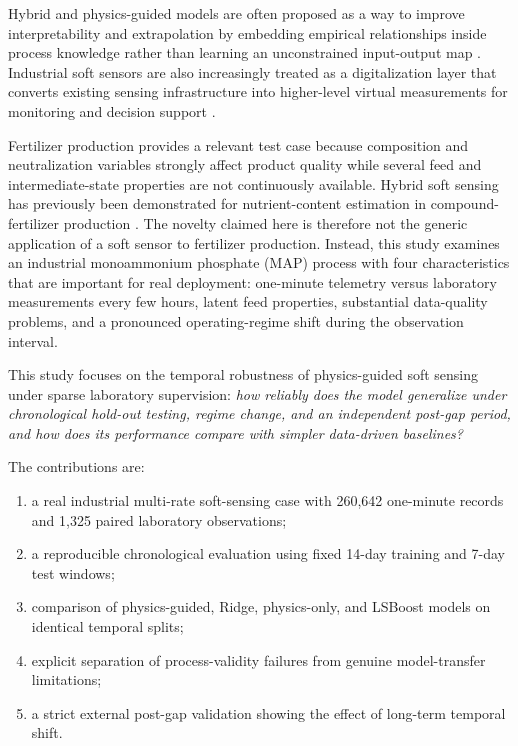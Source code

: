 \documentclass[11pt]{article}
\begin{document}
Hybrid and physics-guided models are often proposed as a way to improve interpretability and extrapolation by embedding empirical relationships inside process knowledge rather than learning an unconstrained input-output map \citep{sansana2021,bradley2022,schweidtmann2024,mousa2025}. Industrial soft sensors are also increasingly treated as a digitalization layer that converts existing sensing infrastructure into higher-level virtual measurements for monitoring and decision support \citep{hamid2022,pietrasik2024,boskabadi2025}.

Fertilizer production provides a relevant test case because composition and neutralization variables strongly affect product quality while several feed and intermediate-state properties are not continuously available. Hybrid soft sensing has previously been demonstrated for nutrient-content estimation in compound-fertilizer production \citep{fu2007}. The novelty claimed here is therefore not the generic application of a soft sensor to fertilizer production. Instead, this study examines an industrial monoammonium phosphate (MAP) process with four characteristics that are important for real deployment: one-minute telemetry versus laboratory measurements every few hours, latent feed properties, substantial data-quality problems, and a pronounced operating-regime shift during the observation interval.

This study focuses on the temporal robustness of physics-guided soft sensing under sparse laboratory supervision: \emph{how reliably does the model generalize under chronological hold-out testing, regime change, and an independent post-gap period, and how does its performance compare with simpler data-driven baselines?}

The contributions are:
\begin{enumerate}[leftmargin=1.8em]
\item a real industrial multi-rate soft-sensing case with 260,642 one-minute records and 1,325 paired laboratory observations;
\item a reproducible chronological evaluation using fixed 14-day training and 7-day test windows;
\item comparison of physics-guided, Ridge, physics-only, and LSBoost models on identical temporal splits;
\item explicit separation of process-validity failures from genuine model-transfer limitations;
\item a strict external post-gap validation showing the effect of long-term temporal shift.
\end{enumerate}
\end{document}
